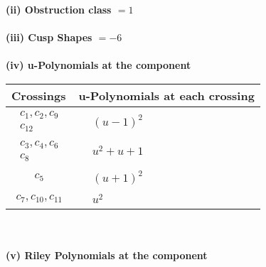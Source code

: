 \documentclass[1p]{elsarticle_modified}
\theoremstyle{definition}
\begin{document}
\flushleft \textbf{(ii) Obstruction class $= 1$}\\~\\
\flushleft \textbf{(iii) Cusp Shapes $= -6$}\\~\\
\newpage\renewcommand{\arraystretch}{1}
\flushleft \textbf{(iv) u-Polynomials at the component}\newline \\
\begin{tabular}{m{50pt}|m{274pt}}
Crossings & \hspace{64pt}u-Polynomials at each crossing \\
\hline $$\begin{aligned}c_{1},c_{2},c_{9}\\c_{12}\end{aligned}$$&$\begin{aligned}
&(u-1)^2
\end{aligned}$\\
\hline $$\begin{aligned}c_{3},c_{4},c_{6}\\c_{8}\end{aligned}$$&$\begin{aligned}
&u^2+u+1
\end{aligned}$\\
\hline $$\begin{aligned}c_{5}\end{aligned}$$&$\begin{aligned}
&(u+1)^2
\end{aligned}$\\
\hline $$\begin{aligned}c_{7},c_{10},c_{11}\end{aligned}$$&$\begin{aligned}
&u^2
\end{aligned}$\\
\hline
\end{tabular}\\~\\
\newpage\renewcommand{\arraystretch}{1}
\flushleft \textbf{(v) Riley Polynomials at the component}\newline \\
\end{document}
